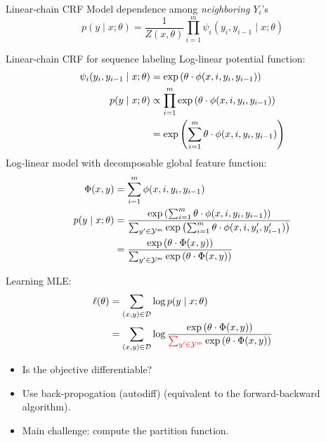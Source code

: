 \documentclass[usenames,dvipsnames,notes]{beamer}
\begin{document}
\begin{frame}
    {Linear-chain CRF}
    Model dependence among \emph{neighboring} $Y_i$'s
    $$
    p(y\mid x; \theta) = \frac{1}{Z(x, \theta)}
    \prod_{i=1}^m\psi_i(y_i, y_{i-1}\mid x; \theta) 
    $$
    \vspace{7em}
\end{frame}

\begin{frame}
    {Linear-chain CRF for sequence labeling}
    Log-linear potential function:
    \begin{align*}
        \psi_i(y_i, y_{i-1}\mid x; \theta) &= \exp\left( \theta\cdot\phi(x,i,y_i,y_{i-1}) \right)\\
        p(y\mid x; \theta) &\propto \prod_{i=1}^m\exp\left( \theta\cdot\phi(x,i,y_i,y_{i-1}) \right) \\
        &= \exp\left(  \sum_{i=1}^m \theta\cdot\phi(x,i,y_i,y_{i-1})  \right)
    \end{align*}
    Log-linear model with decomposable global feature function:
    \begin{align*}
        \Phi(x,y) &= \sum_{i=1}^m \phi(x,i,y_i,y_{i-1})\\
        p(y\mid x; \theta) &= \frac{\exp\left(  \sum_{i=1}^m \theta\cdot\phi(x,i,y_i,y_{i-1})  \right)}
        {\sum_{y'\in\mathcal{Y}^m}  \exp\left(  \sum_{i=1}^m \theta\cdot\phi(x,i,y'_i,y'_{i-1})  \right)}\\
        &= \frac{\exp\left(  \theta\cdot\Phi(x,y)  \right)}
        {\sum_{y'\in\mathcal{Y}^m}  \exp\left(  \theta\cdot\Phi(x,y)  \right)}
    \end{align*}
\end{frame}

\begin{frame}
    {Learning}
    MLE:
    \begin{align*}
    \ell(\theta) &= \sum_{(x,y)\in\mathcal{D}} \log p(y\mid x; \theta) \\
    &= \sum_{(x,y)\in\mathcal{D}} \log \frac{\exp\left(  \theta\cdot\Phi(x,y)  \right)}
        {{\color{red}\sum_{y'\in\mathcal{Y}^m}}  \exp\left(  \theta\cdot\Phi(x,y)  \right)}
    \end{align*}
    \begin{itemize}
        \item Is the objective differentiable?
        \item Use back-propogation (autodiff) (equivalent to the forward-backward algorithm).
        \item Main challenge: compute the partition function. 
    \end{itemize}
\end{frame}
\end{document}
